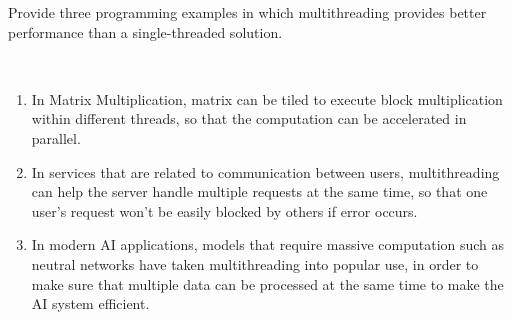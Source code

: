 \begin{exercise}[]{
    Provide three programming examples in which multithreading provides better performance than a single-threaded solution.}
  \begin{solution}
  \par{~}
  \begin{enumerate}
      \item In Matrix Multiplication, matrix can be tiled to execute block multiplication within different threads, so that the computation can be accelerated in parallel.
      \item In services that are related to communication between users, multithreading can help the server handle multiple requests at the same time, so that one user's request won't be easily blocked by others if error occurs.
      \item In modern AI applications, models that require massive computation such as neutral networks have taken multithreading into popular use, in order to make sure that multiple data can be processed at the same time to make the AI system efficient.
  \end{enumerate}
  \end{solution}
  \label{ex1}
\end{exercise}

